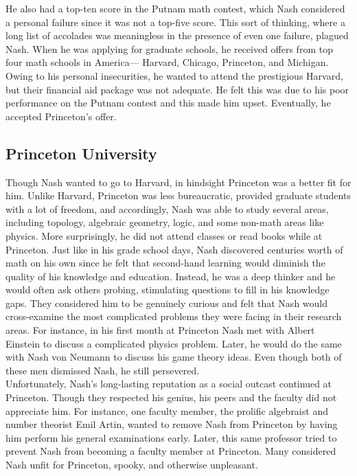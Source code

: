 \documentclass[12pt]{article}
\begin{document}
He also had a top-ten score in the Putnam math contest, which Nash considered a personal failure since it was not a top-five score. This sort of thinking, where a long list of accolades was meaningless in the presence of even one failure, plagued Nash. When he was applying for graduate schools, he received offers from top four math schools in America--- Harvard, Chicago, Princeton, and Michigan. Owing to his personal insecurities, he wanted to attend the prestigious Harvard, but their financial aid package was not adequate. He felt this was due to his poor performance on the Putnam contest and this made him upset. Eventually, he accepted Princeton's offer.

\subsection{Princeton University}

Though Nash wanted to go to Harvard, in hindsight Princeton was a better fit for him. Unlike Harvard, Princeton was less bureaucratic, provided graduate students with a lot of freedom, and accordingly, Nash was able to study several areas, including topology, algebraic geometry, logic, and some non-math areas like physics. More surprisingly, he did not attend classes or read books while at Princeton. Just like in his grade school days, Nash discovered centuries worth of math on his own since he felt that second-hand learning would diminish the quality of his knowledge and education. Instead, he was a deep thinker and he would often ask others probing, stimulating questions to fill in his knowledge gaps. They considered him to be genuinely curious and felt that Nash would cross-examine the most complicated problems they were facing in their research areas. For instance, in his first month at Princeton Nash met with Albert Einstein to discuss a complicated physics problem. Later, he would do the same with Nash von Neumann to discuss his game theory ideas. Even though both of these men dismissed Nash, he still persevered.\\

Unfortunately, Nash's long-lasting reputation as a social outcast continued at Princeton. Though they respected his genius, his peers and the faculty did not appreciate him. For instance, one faculty member, the prolific algebraist and number theorist Emil Artin,  wanted to remove Nash from Princeton by having him perform his general examinations early. Later, this same professor tried to prevent Nash from becoming a faculty member at Princeton. Many considered Nash unfit for Princeton, spooky, and otherwise unpleasant.\\
\end{document}
